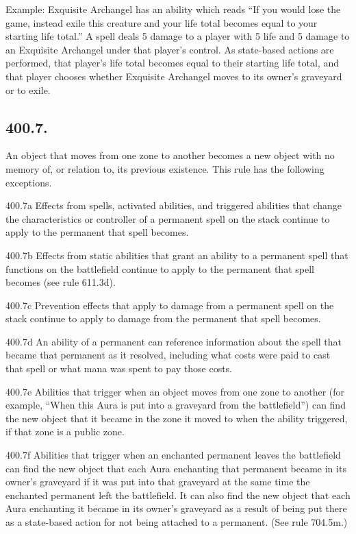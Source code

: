 Example: Exquisite Archangel has an ability which reads “If you would lose the game, instead exile this creature and your life total becomes equal to your starting life total.” A spell deals 5 damage to a player with 5 life and 5 damage to an Exquisite Archangel under that player’s control. As state-based actions are performed, that player’s life total becomes equal to their starting life total, and that player chooses whether Exquisite Archangel moves to its owner’s graveyard or to exile.

\subsection*{400.7.}
An object that moves from one zone to another becomes a new object with no memory of, or relation to, its previous existence. This rule has the following exceptions.

400.7a Effects from spells, activated abilities, and triggered abilities that change the characteristics or controller of a permanent spell on the stack continue to apply to the permanent that spell becomes.

400.7b Effects from static abilities that grant an ability to a permanent spell that functions on the battlefield continue to apply to the permanent that spell becomes (see rule 611.3d).

400.7c Prevention effects that apply to damage from a permanent spell on the stack continue to apply to damage from the permanent that spell becomes.

400.7d An ability of a permanent can reference information about the spell that became that permanent as it resolved, including what costs were paid to cast that spell or what mana was spent to pay those costs.

400.7e Abilities that trigger when an object moves from one zone to another (for example, “When this Aura is put into a graveyard from the battlefield”) can find the new object that it became in the zone it moved to when the ability triggered, if that zone is a public zone.

400.7f Abilities that trigger when an enchanted permanent leaves the battlefield can find the new object that each Aura enchanting that permanent became in its owner’s graveyard if it was put into that graveyard at the same time the enchanted permanent left the battlefield. It can also find the new object that each Aura enchanting it became in its owner’s graveyard as a result of being put there as a state-based action for not being attached to a permanent. (See rule 704.5m.)


